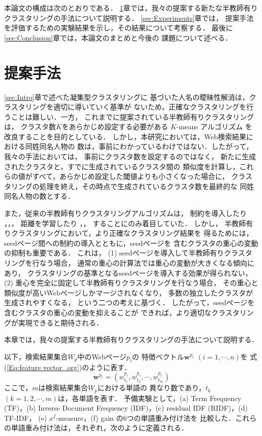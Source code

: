 \documentclass[japanese]{jnlp_1.4}
\begin{document}
本論文の構成は次のとおりである．
\ref{sec:ProposedMethod}章では，我々の提案する新たな半教師有り
クラスタリングの手法について説明する．
\ref{sec:Experiments}章では，
提案手法を評価するための実験結果を示し，その結果について考察する．
最後に\ref{sec:Conclusion}章では，本論文のまとめと今後の
課題について述べる．


\section{提案手法}
\label{sec:ProposedMethod}

\ref{sec:Intro}章で述べた凝集型クラスタリングに
基づいた人名の曖昧性解消は，クラスタリングを適切に導いていく基準が
ないため，正確なクラスタリングを行うことは難しい．一方，
これまでに提案されている半教師有りクラスタリングは，
クラスタ数$K$をあらかじめ設定する必要がある
$K$-means アルゴリズム \cite{MacQueen67} を改良することを目的としている．
しかし，本研究においては，Web検索結果における同姓同名人物の
数は，事前にわかっているわけではない．したがって，我々の手法においては，
事前にクラスタ数を設定するのではなく，
新たに生成されたクラスタと，すでに生成されているクラスタ間の
類似度を計算し，これらの値がすべて，あらかじめ設定した閾値よりも小さくなった場合に，
クラスタリングの処理を終え，その時点で生成されているクラスタ数を最終的な
同姓同名人物の数とする．

また，従来の半教師有りクラスタリングアルゴリズムは，
制約を導入したり \cite{Wagstaff00}，\cite{Wagstaff01}，\cite{Basu02}，
距離を学習したり \cite{Klein02}，\cite{Xing03}，\cite{Bar-Hillel03} 
することにのみ着目していた．
しかし，
半教師有りクラスタリングにおいて，より正確なクラスタリング結果を
得るためには，seedページ間への制約の導入とともに，seedページを
含むクラスタの重心の変動の抑制も重要である．
これは，
(1) seedページを導入して半教師有りクラスタリングを行なう場合，
通常の重心の計算法では重心の変動が大きくなる傾向にあり，
クラスタリングの基準となるseedページを導入する効果が得られない，
(2) 重心を完全に固定して半教師有りクラスタリングを行なう場合，
その重心と類似度が高いWebページしかマージされなくなり，
多数の独立したクラスタが生成されやすくなる，
という二つの考えに基づく．
したがって，seedページを含むクラスタの重心の変動を抑えることが
できれば，より適切なクラスタリングが実現できると期待される．

本章では，我々の提案する半教師有りクラスタリングの手法について説明する．

以下，検索結果集合$W_{p}$中のWebページ$p_{i}$の
特徴ベクトル$\boldsymbol{w}^{p_{i}}$ $(i=1,\cdots ,n)$を
式(\ref{Eq:feature vector_org})のように表す．
\begin{equation}
 \boldsymbol{w}^{p_{i}}=(w_{t_{1}}^{p_{i}},w_{t_{2}}^{p_{i}},\cdots, w_{t_{m}}^{p_{i}})
\label{Eq:feature vector_org}
\end{equation}
ここで，$m$は検索結果集合$W_{p}$における単語の
異なり数であり，$t_{k}$ $(k=1,2,\cdots, m)$は，各単語を表す．
予備実験として，(a) Term Frequency (TF)，(b) Inverse Document
Frequency (IDF)，(c) residual IDF (RIDF)，(d) TF-IDF，
(e) $x^{I}$-measure，(f) gain の6つの単語重み付け法を
比較した．これらの単語重み付け法は，それぞれ，次のように定義される．
\end{document}
